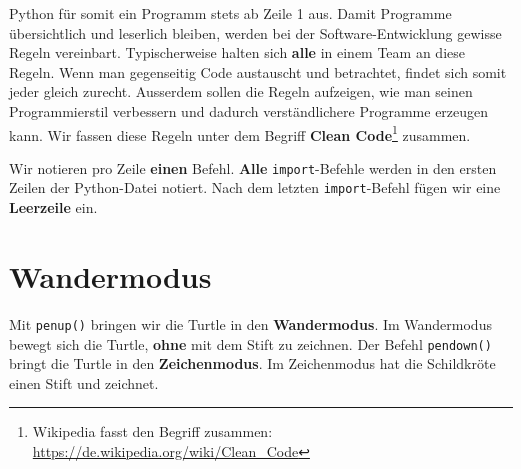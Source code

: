 Python für somit ein Programm stets ab Zeile 1 aus. Damit Programme übersichtlich und leserlich bleiben, werden bei der Software-Entwicklung gewisse Regeln vereinbart. Typischerweise halten sich \textbf{alle} in einem Team an diese Regeln. Wenn man gegenseitig Code austauscht und betrachtet, findet sich somit jeder gleich zurecht. Ausserdem sollen die Regeln aufzeigen, wie man seinen Programmierstil verbessern und dadurch verständlichere Programme erzeugen kann. Wir fassen diese Regeln unter dem Begriff \textbf{Clean Code}\footnote{Wikipedia fasst den Begriff  zusammen: \url{https://de.wikipedia.org/wiki/Clean_Code}} zusammen.

\begin{cleancode}
Wir notieren pro Zeile \textbf{einen} Befehl. \textbf{Alle} \lstinline{import}-Befehle werden in den ersten Zeilen der Python-Datei notiert. Nach dem letzten \lstinline{import}-Befehl fügen wir eine \textbf{Leerzeile} ein.
\end{cleancode}

\section{Wandermodus}

Mit \lstinline{penup()} bringen wir die Turtle in den \textbf{Wandermodus}. Im Wandermodus bewegt sich die Turtle, \textbf{ohne} mit dem Stift zu zeichnen. Der Befehl \lstinline{pendown()} bringt die Turtle in den \textbf{Zeichenmodus}. Im Zeichenmodus hat die Schildkröte einen Stift und zeichnet.

